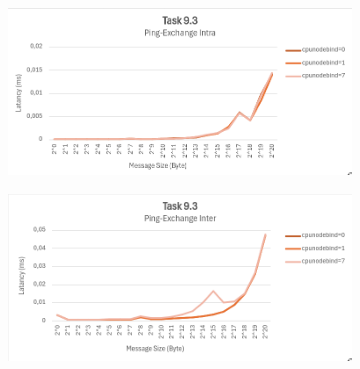 \documentclass{report}
\begin{document}
\begin{figure}[h]
	\begin{subfigure}{.5\textwidth}
		\centering
		\includegraphics[width=\textwidth]{cpunodebind2}
	\end{subfigure}
	\begin{subfigure}{.5\textwidth}
		\centering
		\includegraphics[width=\textwidth]{cpunodebind3}
	\end{subfigure}
\end{figure}
\end{document}
